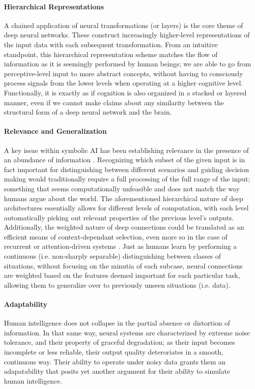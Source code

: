 \documentclass[]{article}
\begin{document}
\paragraph{Hierarchical Representations}
A chained application of neural transformations (or layers) is the core theme of deep neural networks. These construct increasingly higher-level representations of the input data with each subsequent transformation. From an intuitive standpoint, this hierarchical representation scheme matches the flow of information as it is seemingly performed by human beings; we are able to go from perceptive-level input to more abstract concepts, without having to consciously process signals from the lower levels when operating at a higher cognitive level. Functionally, it is exactly as if cognition is also organized in a stacked or layered manner, even if we cannot make claims about any similarity between the structural form of a deep neural network and the brain.

\paragraph{Relevance and Generalization}
A key issue within symbolic AI has been establishing relevance in the presence of an abundance of information \cite{Dreyfus1972-DREWCC}. Recognizing which subset of the given input is in fact important for distinguishing between different scenarios and guiding decision making would traditionally require a full processing of the full range of the input; something that seems computationally unfeasible and does not match the way humans argue about the world. The aforementioned hierarchical nature of deep architectures essentially allows for different levels of computation, with each level automatically picking out relevant properties of the previous level's outputs. Additionally, the weighted nature of deep connections could be translated as an efficient means of context-dependant selection, even more so in the case of recurrent or attention-driven systems \cite{DBLP:journals/corr/MnihHGK14}. Just as humans learn by performing a continuous (i.e. non-sharply separable) distinguishing between classes of situations, without focusing on the minutia of each subcase, neural connections are weighted based on the features deemed important for each particular task, allowing them to generalize over to previously unseen situations (i.e. data).

\paragraph{Adaptability}
Human intelligence does not collapse in the partial absence or distortion of information. In that same way, neural systems are characterized by extreme noise tolerance, and their property of graceful degradation; as their input becomes incomplete or less reliable, their output quality deteroriates in a smooth, continuous way. Their ability to operate under noisy data grants them an adapatability that posits yet another argument for their ability to simulate human intelligence. 
\end{document}
